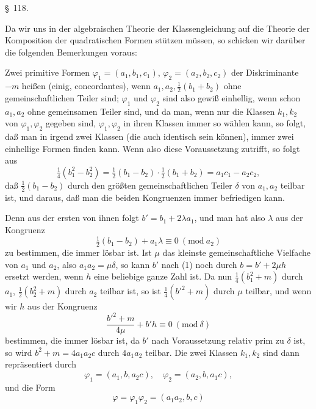 \begin{center}
\S\ 118. \textbf{}
\end{center}

Da wir uns in der algebraischen Theorie der Klassengleichung auf die Theorie der Komposition der quadratischen Formen stützen müssen, so schicken wir darüber die folgenden Bemerkungen voraus:

Zwei primitive Formen $\varphi_1=(a_1,b_1,c_1)$, $\varphi_2=(a_2,b_2,c_2)$ der Diskriminante $-m$ heißen  (einig, concordantes), wenn $a_1,a_2,\tfrac{1}{2}(b_1+b_2)$ ohne gemeinschaftlichen Teiler sind; $\varphi_1$ und $\varphi_2$ sind also gewiß einhellig, wenn schon $a_1,a_2$ ohne gemeinsamen Teiler sind, und da man, wenn nur die Klassen $k_1,k_2$ von $\varphi_1,\varphi_2$ gegeben sind, $\varphi_1,\varphi_2$ in ihren Klassen immer so wählen kann, so folgt, daß man in irgend zwei Klassen (die auch identisch sein können), immer zwei einhellige Formen finden kann. Wenn also diese Voraussetzung zutrifft, so folgt aus
\[
\tfrac{1}{4}(b_1^2-b_2^2) = \tfrac{1}{2}(b_1-b_2)\cdot\tfrac{1}{2}(b_1+b_2) = a_1c_1-a_2c_2,
\]
daß $\tfrac{1}{2}(b_1-b_2)$ durch den größten gemeinschaftlichen Teiler $\delta$ von $a_1,a_2$ teilbar ist, und daraus, daß man die beiden Kongruenzen
immer befriedigen kann.

Denn aus der ersten von ihnen folgt $b'=b_1+2\lambda a_1$, und man hat also $\lambda$ aus der Kongruenz
\[
\tfrac{1}{2}(b_1-b_2) + a_1\lambda \equiv 0\ (\mathrm{mod}\ a_2)
\]
zu bestimmen, die immer lösbar ist. Ist $\mu$ das kleinste gemeinschaftliche Vielfache von $a_1$ und $a_2$, also $a_1a_2=\mu\delta$, so kann $b'$ nach (1) noch durch $b=b'+2\mu h$ ersetzt werden, wenn $h$ eine beliebige ganze Zahl ist. Da nun $\tfrac{1}{4}(b_1^2+m)$ durch $a_1$, $\tfrac{1}{2}(b_2^2+m)$ durch $a_2$ teilbar ist, %
so ist $\tfrac{1}{4}(b'^2+m)$ durch $\mu$ teilbar, und wenn wir $h$ aus der Kongruenz
\[
\frac{b'^2+m}{4\mu} + b'h \equiv 0\ (\mathrm{mod}\ \delta)
\]
bestimmen, die immer lösbar ist, da $b'$ nach Voraussetzung relativ prim zu $\delta$ ist, so wird $b^2+m=4a_1a_2c$ durch $4a_1a_2$ teilbar. Die zwei Klassen $k_1,k_2$ sind dann repräsentiert durch
\[
\varphi_1=(a_1,b,a_2c), \quad \varphi_2=(a_2,b,a_1c),
\]
und die Form
\[
\varphi = \varphi_1\varphi_2 = (a_1a_2,b,c)
\]

